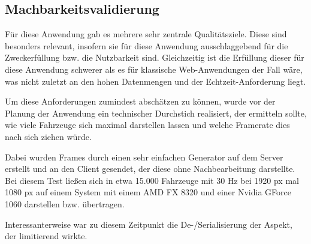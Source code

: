 
\subsection{Machbarkeitsvalidierung}


Für diese Anwendung gab es mehrere sehr zentrale Qualitätsziele.
Diese sind besonders relevant, insofern sie für diese Anwendung ausschlaggebend für die Zweckerfüllung bzw. die Nutzbarkeit sind.
Gleichzeitig ist die Erfüllung dieser für diese Anwendung schwerer als es für klassische Web-Anwendungen der Fall wäre, was nicht zuletzt an den hohen Datenmengen und der Echtzeit-Anforderung liegt.

Um diese Anforderungen zumindest abschätzen zu können, wurde vor der Planung der Anwendung ein technischer Durchstich realisiert, der ermitteln sollte, wie viele Fahrzeuge sich maximal darstellen lassen und welche Framerate dies nach sich ziehen würde.

Dabei wurden Frames durch einen sehr einfachen Generator auf dem Server erstellt und an den Client gesendet, der diese ohne Nachbearbeitung darstellte.
Bei diesem Test ließen sich in etwa 15.000 Fahrzeuge mit 30 Hz bei 1920 px mal 1080 px auf einem System mit einem AMD FX 8320 und einer Nvidia GForce 1060 darstellen bzw. übertragen.

Interessanterweise war zu diesem Zeitpunkt die De-/Serialisierung der Aspekt, der limitierend wirkte.

